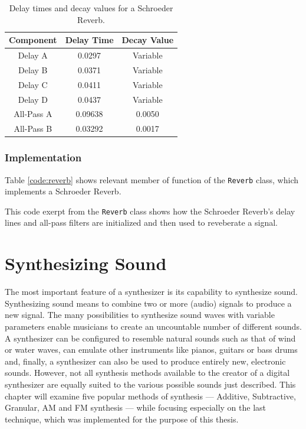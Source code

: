 \documentclass[12pt,twoside]{report}
\begin{document}
\begin{table}[hb!]

  \centering

  \begin{tabular}[]{ | c | c | c |}
    \hline
    \rowcolor[gray]{0.8}
    Component & Delay Time & Decay Value \\\hline
    Delay A & 0.0297 & Variable\\\hline
    Delay B & 0.0371 & Variable \\\hline
    Delay C & 0.0411 & Variable \\\hline
    Delay D & 0.0437 & Variable \\\hline
    All-Pass A & 0.09638 & 0.0050 \\\hline
    All-Pass B & 0.03292 & 0.0017\\
    \hline
  \end{tabular}

  \caption{Delay times and decay values for a Schroeder Reverb.}

  \label{tb:reverb}

\end{table}

\pagebreak

\subsection{Implementation}

Table \ref{code:reverb} shows relevant member of function of the \texttt{Reverb} class, which implements a Schroeder Reverb.

\begin{table}[h!]
  \caption{This code exerpt from the \texttt{Reverb} class shows how the Schroeder Reverb's delay lines and all-pass filters are initialized and then used to reveberate a signal.}
  \label{code:reverb}
\end{table}

\chapter{Synthesizing Sound}

The most important feature of a synthesizer is its capability to synthesize sound. Synthesizing sound means to combine two or more (audio) signals to produce a new signal. The many possibilities to synthesize sound waves with variable parameters enable musicians to create an uncountable number of different sounds. A synthesizer can be configured to resemble natural sounds such as that of wind or water waves, can emulate other instruments like pianos, guitars or bass drums and, finally, a synthesizer can also be used to produce entirely new, electronic sounds. However, not all synthesis methods available to the creator of a digital synthesizer are equally suited to the various possible sounds just described. This chapter will examine five popular methods of synthesis --- Additive, Subtractive, Granular, AM and FM synthesis --- while focusing especially on the last technique, which was implemented for the purpose of this thesis.
\end{document}
